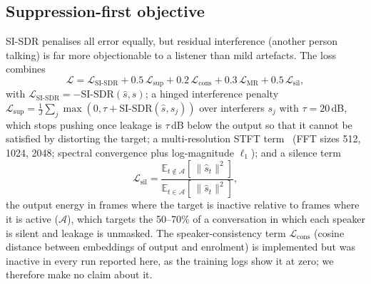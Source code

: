 \documentclass[conference]{IEEEtran}
\newcommand{\sisdr}{\mathrm{SI\text{-}SDR}}
\newcommand{\dB}{\,dB\xspace}
\begin{document}
\subsection{Suppression-first objective}
SI-SDR penalises all error equally, but residual interference (another person talking) is far more objectionable to a listener than mild artefacts. The loss combines
\begin{equation}
\mathcal{L} = \mathcal{L}_{\sisdr} + 0.5\,\mathcal{L}_{\mathrm{sup}} + 0.2\,\mathcal{L}_{\mathrm{cons}} + 0.3\,\mathcal{L}_{\mathrm{MR}} + 0.5\,\mathcal{L}_{\mathrm{sil}},
\label{eq:loss}
\end{equation}
with $\mathcal{L}_{\sisdr}=-\sisdr(\hat{s},s)$; a hinged interference penalty $\mathcal{L}_{\mathrm{sup}}=\frac{1}{J}\sum_j \max(0,\tau+\sisdr(\hat{s},s_j))$ over interferers $s_j$ with $\tau=20$\dB, which stops pushing once leakage is $\tau$\dB below the output so that it cannot be satisfied by distorting the target; a multi-resolution STFT term~\cite{yamamoto2020pwg} (FFT sizes 512, 1024, 2048; spectral convergence plus log-magnitude $\ell_1$); and a silence term
\begin{equation}
\mathcal{L}_{\mathrm{sil}} = \frac{\mathbb{E}_{t\notin\mathcal{A}}[\,\lVert\hat{s}_t\rVert^2]}{\mathbb{E}_{t\in\mathcal{A}}[\,\lVert\hat{s}_t\rVert^2]},
\label{eq:silence}
\end{equation}
the output energy in frames where the target is inactive relative to frames where it is active ($\mathcal{A}$), which targets the 50--70\% of a conversation in which each speaker is silent and leakage is unmasked. The speaker-consistency term $\mathcal{L}_{\mathrm{cons}}$ (cosine distance between embeddings of output and enrolment) is implemented but was inactive in every run reported here, as the training logs show it at zero; we therefore make no claim about it.
\end{document}
